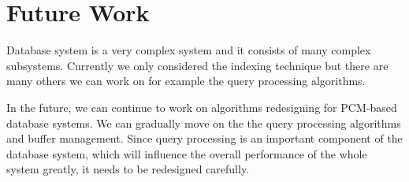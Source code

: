 \section{Future Work}

Database system is a very complex system and it consists of many complex subsystems\cite{ramakrishnan2003database,date1983introduction}. 
Currently we only considered the indexing technique but there are many others we can work on for example the query processing algorithms. 

In the future, we can continue to work on algorithms redesigning for PCM-based database systems. We can gradually move on the the query processing algorithms and buffer management. Since query processing is an important component of the database system, which will influence the overall performance of the whole system greatly, it needs to be redesigned carefully. 

